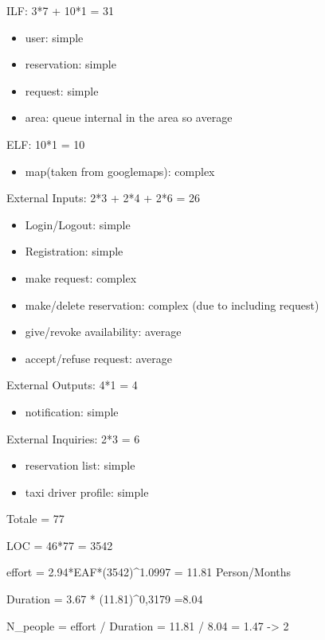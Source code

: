 ILF: 3*7 + 10*1 = 31
\begin{itemize}
  \item user: simple
  \item reservation: simple
  \item request: simple
  \item area: queue internal in the area so average
\end{itemize}

ELF: 10*1 = 10
\begin{itemize}
  \item map(taken from googlemaps): complex
\end{itemize}

External Inputs: 2*3 + 2*4 + 2*6 = 26
\begin{itemize}
  \item Login/Logout: simple
  \item Registration: simple
  \item make request: complex
  \item make/delete reservation: complex (due to including request)
  \item give/revoke availability: average
  \item accept/refuse request: average
\end{itemize}

External Outputs: 4*1 = 4
\begin{itemize}
  \item notification: simple
\end{itemize}

External Inquiries: 2*3 = 6
\begin{itemize}
  \item reservation list: simple
  \item taxi driver profile: simple
\end{itemize}

Totale = 77

LOC = 46*77 = 3542

effort = 2.94*EAF*(3542)^1.0997 = 11.81 Person/Months

Duration = 3.67 * (11.81)^0,3179 =8.04

N_people = effort / Duration = 11.81 / 8.04 = 1.47 -> 2
